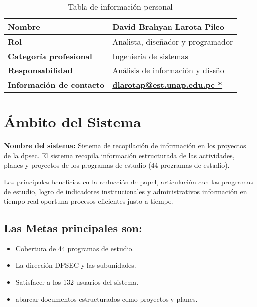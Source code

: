 \documentclass[12pt,a4paper]{article}
\begin{document}
\begin{table}[h!]
    \centering
    \begin{tabular}{|p{7cm}|p{8cm}|}
    \hline
    \rowcolor{pastelBlue} \textbf{Nombre} & David Brahyan Larota Pilco \\ \hline
    \textbf{Rol} & Analista, diseñador y programador \\ \hline
    \rowcolor{pastelBlue} \textbf{Categoría profesional} & Ingeniería de sistemas \\ \hline
    \textbf{Responsabilidad} & Análisis de información y diseño \\ \hline
    \rowcolor{pastelBlue} \textbf{Información de contacto} & \href{mailto:dlarotap@est.unap.edu.pe}{\textbf{dlarotap@est.unap.edu.pe *}} \\ \hline
    \end{tabular}
    \caption{Tabla de información personal}
    \label{tab:personal_info}
\end{table}




\section{Ámbito del Sistema}
\textbf{Nombre del sistema:} Sistema de recopilación de información en los proyectos de la \gls{dpsec}.
\espacio 
El sistema recopila información estructurada de las actividades, planes y proyectos de los programas de estudio (44 programas de estudio).

\espacio 
Los principales beneficios en la reducción de papel, articulación con los programas de estudio, logro de indicadores institucionales y administrativos información en tiempo real oportuna procesos eficientes justo a tiempo.

\subsection*{Las Metas principales son:}
\begin{itemize}
    \item Cobertura de 44 programas de estudio.
    \item La dirección DPSEC y las subunidades.
    \item Satisfacer a los 132 usuarios del sistema.
    \item abarcar documentos estructurados como proyectos y planes.
    
    \end{itemize}
    
\end{document}
